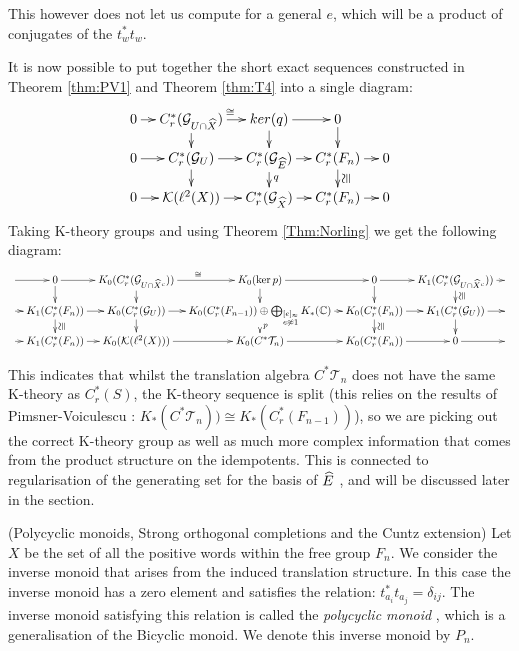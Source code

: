 \begin{example}
This however does not let us compute for a general $e$, which will be a product of conjugates of the $t_{w}^{*}t_{w}$.

It is now possible to put together the short exact sequences constructed in Theorem \ref{thm:PV1} and Theorem \ref{thm:T4} into a single diagram:
$$
\xymatrix@=1em{ 0 \ar[r] & C^{*}_{r}(\G_{U\cap \X}) \ar[d]\ar[r]^{\cong} & ker(q)\ar[d] \ar[r] & 0 \ar[d]&  \\
0 \ar[r] & C^{*}_{r}(\G_{U}) \ar[d] \ar[r] & C^{*}_{r}(\G_{\E}) \ar[d]^{q} \ar[r] & C^{*}_{r}(F_{n}) \ar[d]^{\ucong}\ar[r] & 0\\
0 \ar[r] & \mathcal{K}(\ell^{2}(X)) \ar[r] & C^{*}_{r}(\G_{\X}) \ar[r] & C^{*}_{r}(F_{n}) \ar[r] & 0
}
$$
Taking K-theory groups and using Theorem \ref{Thm:Norling} we get the following diagram:
$$
\xymatrix@=0.7em{\ar[r] & 0 \ar[r]\ar[d] & K_{0}(C^{*}_{r}(\G_{U\cap \widehat{X}^{c}}))\ar[d] \ar[r]^{\cong}& K_{0}(\ker p) \ar[r]\ar[d]& 0 \ar[r]\ar[d] & K_{1}(C^{*}_{r}(\G_{U\cap \widehat{X}^{c}})) \ar[r]\ar[d]^{\ucong} &\\
\ar[r] & K_{1}(C^{*}_{r}(F_{n})) \ar[r]\ar[d]^{\ucong} & K_{0}(C^{*}_{r}(\G_{U}))\ar[r]\ar[d]& K_{0}(C^{*}_{r}(F_{n-1})) \oplus \bigoplus_{\substack{[e]_{\approx}\\ e \not \approx 1}} K_{*}(\mathbb{C})\ar[r]\ar[d]^{p}& K_{0}(C^{*}_{r}(F_{n}))\ar[r]\ar[d]^{\ucong} & K_{1}(C^{*}_{r}(\G_{U}))\ar[d] \ar[r] & \\
\ar[r] & K_{1}(C^{*}_{r}(F_{n})) \ar[r]& K_{0}(\mathcal{K}(\ell^{2}(X))) \ar[r]& K_{0}(C^{*}\mathcal{T}_{n}) \ar[r]& K_{0}(C^{*}_{r}(F_{n})) \ar[r]& 0 \ar[r] & 
}
$$

This indicates that whilst the translation algebra $C^{*}\mathcal{T}_{n}$ does not have the same K-theory as $C^{*}_{r}(S)$, the K-theory sequence is split (this relies on the results of Pimsner-Voiculescu \cite{MR670181}: $K_{*}(C^{*}\mathcal{T}_{n}))\cong K_{*}(C^{*}_{r}(F_{n-1}))$), so we are picking out the correct K-theory group as well as much more complex information that comes from the product structure on the idempotents. This is connected to regularisation of the generating set for the basis of $\widehat{E}$ \cite{CEL-2}, and will be discussed later in the section.

\begin{example}(Polycyclic monoids, Strong orthogonal completions and the Cuntz extension)
Let $X$ be the set of all the positive words within the free group $F_{n}$. We consider the inverse monoid that arises from the induced translation structure. In this case the inverse monoid has a zero element and satisfies the relation: $t_{a_{i}}^{*}t_{a_{j}}=\delta_{ij}$. The inverse monoid satisfying this relation is called the \textit{polycyclic monoid} \cite{MR2372319}, which is a generalisation of the Bicyclic monoid. We denote this inverse monoid by $P_{n}$.


\end{example}
\end{example}
